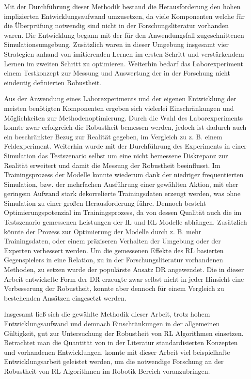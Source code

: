 Mit der Durchführung dieser Methodik bestand die Herausforderung den hohen implizierten Entwicklungsaufwand umzusetzen, da viele Komponenten welche für die Überprüfung notwendig sind nicht in der Forschungsliteratur vorhanden waren.
Die Entwicklung begann mit der für den Anwendungsfall zugeschnittenen Simulationsumgebung.
Zusätzlich waren in dieser Umgebung insgesamt vier Strategien anhand von imitierenden Lernen im ersten Schritt und verstärkendem Lernen im zweiten Schritt zu optimieren. 
Weiterhin bedarf das Laborexperiment einem Testkonzept zur Messung und Auswertung der in der Forschung nicht eindeutig definierten Robustheit.

Aus der Anwendung eines Laborexperiments und der eigenen Entwicklung der meisten benötigten Komponenten ergeben sich vielerlei Einschränkungen und Möglichkeiten zur Methodenoptimierung. %
Durch die Wahl des Laborexperiments konnte zwar erfolgreich die Robustheit bemessen werden, jedoch ist dadurch auch ein beschränkter Bezug zur Realität gegeben, im Vergleich zu z. B. einem Feldexperiment.
Weiterhin wurde mit der Durchführung des Experiments in einer Simulation das Testszenario selbst um eine nicht bemessene Diskrepanz zur Realität erweitert und damit die Messung der Robustheit beeinflusst.
Im Trainingsprozess der Modelle konnte wiederum dank der niedriger frequentierten Simulation, bzw. der mehrfachen Ausführung einer gewählten Aktion, mit eher geringem Aufwand stark dekorrelierte Trainingsdaten erzeugt werden, was ohne Simulation zu einer großen Herausforderung führe.
Dennoch besteht Optimierungspotenzial im Trainingsprozess, da von dessen Qualität auch die im Testszenario gemessenen Leistungen der IL und RL Modelle abhängen.
Zusätzlich könnte der Prozess zur Optimierung der Modelle durch z. B. mehr Trainingsdaten, oder einem präziseren Verhalten der Umgebung oder der Experten verbessert werden.
Um die gemessenen Effekte des RL basierten Gegenspielers in eine Relation, zu in der Forschungsliteratur vorhandenen Methoden, zu setzen wurde der populärste Ansatz DR angewendet.
Die in dieser Arbeit entwickelte Form der DR erzeugte zwar selbst nicht in jeder Hinsicht eine Verbesserung der Robustheit, konnte aber dennoch für einem Vergleich zu bestehenden Ansätzen eingesetzt werden.

Insgesamt ließ sich die gewählte Methodik dieser Arbeit, trotz hohem Entwicklungsaufwand und demnach Einschränkungen in der allgemeinen Gültigkeit, gut zur Untersuchung der Robustheit von RL Algorithmen einsetzen.
Betrachtet man die Quantität von in der Literatur standardisierten Konzepten und vorhandenen Entwicklungen, konnte mit dieser Arbeit viel beispielhafte Entwicklungsarbeit geleistet werden, um die notwendige Forschung an der Robustheit von RL Algorithmen im Robotik Bereich voranzubringen.

